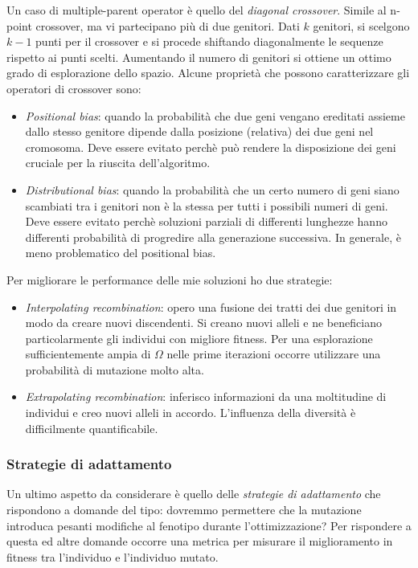 \documentclass[10pt,a4paper]{article}
\begin{document}
Un caso di multiple-parent operator è quello del \emph{diagonal crossover}. Simile al n-point crossover, ma vi partecipano più di due genitori. Dati $k$ genitori, si scelgono $k-1$ punti per il crossover e si procede shiftando diagonalmente le sequenze rispetto ai punti scelti. Aumentando il numero di genitori si ottiene un ottimo grado di esplorazione dello spazio. Alcune proprietà che possono caratterizzare gli operatori di crossover sono:

\begin{itemize}
\item{\emph{Positional bias}: quando la probabilità che due geni vengano ereditati assieme dallo stesso genitore dipende dalla posizione (relativa) dei due geni nel cromosoma. Deve essere evitato perchè può rendere la disposizione dei geni cruciale per la riuscita dell'algoritmo.}
\item{\emph{Distributional bias}: quando la probabilità che un certo numero di geni siano scambiati tra i genitori non è la stessa per tutti i possibili numeri di geni. Deve essere evitato perchè soluzioni parziali di differenti lunghezze hanno differenti probabilità di progredire alla generazione successiva. In generale, è meno problematico del positional bias.}
\end{itemize}

Per migliorare le performance delle mie soluzioni ho due strategie:

\begin{itemize}
\item{\emph{Interpolating recombination}: opero una fusione dei tratti dei due genitori in modo da creare nuovi discendenti. Si creano nuovi alleli e ne beneficiano particolarmente gli individui con migliore fitness. Per una esplorazione sufficientemente ampia di $\Omega$ nelle prime iterazioni occorre utilizzare una probabilità di mutazione molto alta.}
\item{\emph{Extrapolating recombination}: inferisco informazioni da una moltitudine di individui e creo nuovi alleli in accordo. L'influenza della diversità è difficilmente quantificabile.}
\end{itemize}

\subsubsection{Strategie di adattamento}

Un ultimo aspetto da considerare è quello delle \emph{strategie di adattamento} che rispondono a domande del tipo: dovremmo permettere che la mutazione introduca pesanti modifiche al fenotipo durante l'ottimizzazione? Per rispondere a questa ed altre domande occorre una metrica per misurare il miglioramento in fitness tra l'individuo e l'individuo mutato. 
\end{document}
